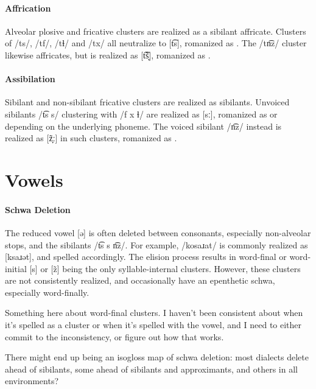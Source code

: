 \paragraph{Affrication}
Alveolar plosive and fricative clusters are realized as a sibilant affricate. Clusters of /ts/, /tf/, /tɬ/ and /tx/ all neutralize to [t͡s], romanized as . The /tn͡z/ cluster likewise affricates, but is realized as [t͡s̞̃], romanized as . 

\paragraph{Assibilation}
Sibilant and non-sibilant fricative clusters are realized as sibilants. Unvoiced sibilants /t͡s s/ clustering with /f x ɬ/ are realized as [sː], romanized as  or  depending on the underlying phoneme. The voiced sibilant /n͡z/ instead is realized as [z̞̃ː] in such clusters, romanized as .

\section{Vowels}
\paragraph{Schwa Deletion}
The reduced vowel [ə] is often deleted between consonants, especially non-alveolar stops, and the sibilants /t͡s s n͡z/. For example,  /kosaɹat/ is commonly realized as [ksaɹət], and spelled accordingly. The elision process results in word-final or word-initial [s] or [z̃] being the only syllable-internal clusters. However, these clusters are not consistently realized, and occasionally have an epenthetic schwa, especially word-finally. 

\begin{kaobox}[frametitle=\sc todo:] 
Something here about word-final clusters. I haven't been consistent about when it's spelled as a cluster or when it's spelled with the vowel, and I need to either commit to the inconsistency, or figure out how that works.
\end{kaobox}

\begin{kaobox}[frametitle=\sc todo:] 
There might end up being an isogloss map of schwa deletion: most dialects delete ahead of sibilants, some ahead of sibilants and approximants, and others in all environments?
\end{kaobox}


